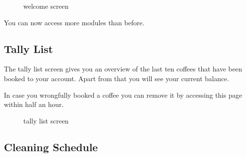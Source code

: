 \begin{figure}[htbp]
\centering
{}
\caption{welcome screen}
\end{figure}

You can now access more modules than before.

\subsection{Tally List}\label{tally-list-1}

The tally list screen gives you an overview of the last ten coffees that
have been booked to your account. Apart from that you will see your
current balance.

In case you wrongfully booked a coffee you can remove it by accessing
this page within half an hour.

\begin{figure}[htbp]
\centering
{}
\caption{tally list screen}
\end{figure}

\subsection{Cleaning Schedule}\label{cleaning-schedule-1}

